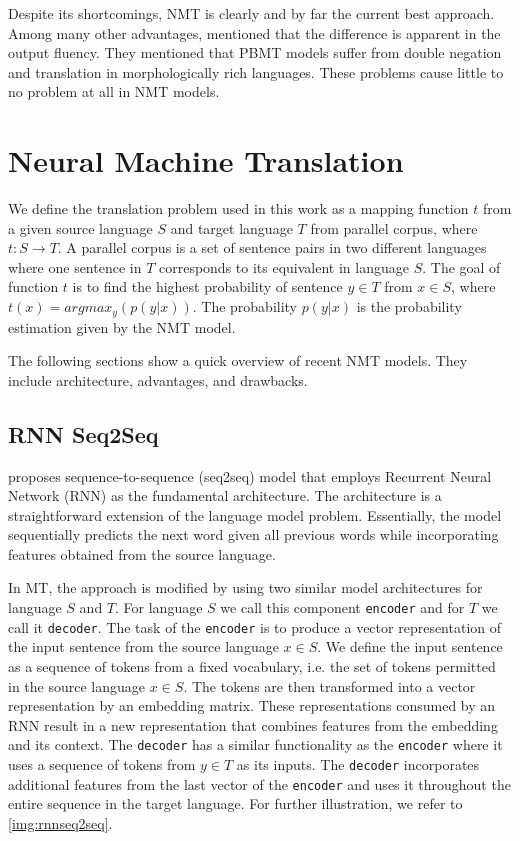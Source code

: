 Despite its shortcomings, NMT is clearly and by far the current best approach. Among many other advantages,  mentioned that the difference is apparent in the output fluency. They mentioned that PBMT models suffer from double negation and translation in morphologically rich languages. These problems cause little to no problem at all in NMT models.

\section{Neural Machine Translation}
\label{sec:bm_nmt}
We define the translation problem used in this work as a mapping function $t$ from a given source language $S$ and target language $T$ from parallel corpus, where $t : S \rightarrow T$. A parallel corpus is a set of sentence pairs in two different languages where one sentence in $T$ corresponds to its equivalent in language $S$. The goal of function $t$ is to find the highest probability of sentence $y \in T$ from $x \in S$, where $t(x) = argmax_y(p(y|x))$. The probability $p(y|x)$ is the probability estimation given by the NMT model.

The following sections show a quick overview of recent NMT models. They include architecture, advantages, and drawbacks.

\subsection{RNN Seq2Seq}
 proposes sequence-to-sequence (seq2seq) model that employs Recurrent Neural Network (RNN) as the fundamental architecture. The architecture is a straightforward extension of the language model problem. Essentially, the model sequentially predicts the next word given all previous words while incorporating features obtained from the source language.

In MT, the approach is modified by using two similar model architectures for language $S$ and $T$. For language $S$ we call this component \texttt{encoder} and for $T$ we call it \texttt{decoder}.
The task of the \texttt{encoder} is to produce a vector representation of the input sentence from the source language $x \in S$. We define the input sentence as a sequence of tokens from a fixed vocabulary, i.e. the set of tokens permitted in the source language $x \in S$. The tokens are then transformed into a vector representation by an embedding matrix. These representations consumed by an RNN result in a new representation that combines features from the embedding and its context. The \texttt{decoder} has a similar functionality as the \texttt{encoder} where it uses a sequence of tokens from $y \in T$ as its inputs. The \texttt{decoder} incorporates additional features from the last vector of the \texttt{encoder} and uses it throughout the entire sequence in the target language. For further illustration, we refer to \cref{img:rnnseq2seq}.

